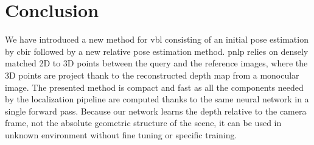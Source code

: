 \section{Conclusion}
\label{sec:conclusion_pnlp}

We have introduced a new method for \ac{vbl} consisting of an initial pose estimation by \ac{cbir} followed by a new relative pose estimation method. \ac{pnlp} relies on densely matched 2D to 3D points between the query and the reference images, where the 3D points are project thank to the reconstructed depth map from a monocular image. The presented method is compact and fast as all the components needed by the localization pipeline are computed thanks to the same neural network in a single forward pass. Because our network learns the depth relative to the camera frame, not the absolute geometric structure of the scene, it can be used in unknown environment without fine tuning or specific training.